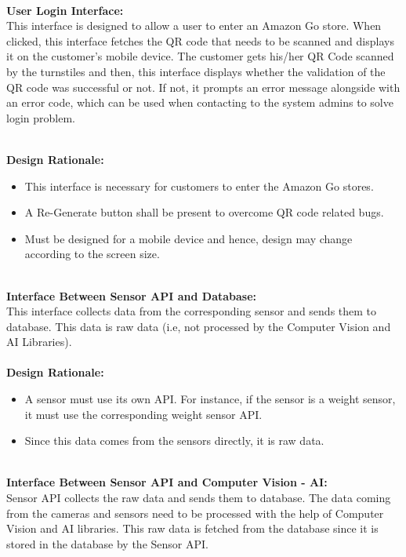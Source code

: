 \documentclass[11pt]{article}
\newcounter{subsubsubsection}[subsubsection]
\begin{document}
    \textbf{\\User Login Interface:\\}
    This interface is designed to allow a user to enter an Amazon Go store. When clicked, this interface fetches the QR code that needs to be scanned 
    and displays it on the customer's mobile device. The customer gets his/her QR Code scanned by the turnstiles and then, this interface displays whether the 
    validation of the QR code was successful or not. If not, it prompts an error message alongside with an error code, which can be used when contacting to the system admins 
    to solve login problem. 

    \textbf{\\Design Rationale:}
    \begin{itemize}
       \item This interface is necessary for customers to enter the Amazon Go stores.
       \item A Re-Generate button shall be present to overcome QR code related bugs.
       \item Must be designed for a mobile device and hence, design may change according to the screen size.
    \end{itemize}
    

    \textbf{\\Interface Between Sensor API and Database:\\}
    This interface collects data from the corresponding sensor and sends them to database. This data is raw data (i.e, not processed by the Computer Vision and AI Libraries).\\
    \textbf{\\Design Rationale:}
    
    \begin{itemize}
       \item A sensor must use its own API. For instance, if the sensor is a weight sensor, it must use the corresponding weight sensor API.
        \item Since this data comes from the sensors directly, it is raw data. 
    \end{itemize}

    \textbf{\\Interface Between Sensor API and Computer Vision - AI:\\}
    Sensor API collects the raw data and sends them to database. The data coming from the cameras and sensors need to be processed with the help of
    Computer Vision and AI libraries. This raw data is fetched from the database since it is stored in the database by the Sensor API. 
\end{document}
